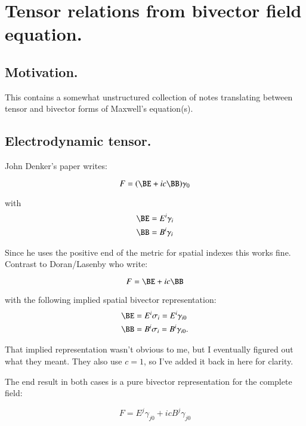 \chapter{Tensor relations from bivector field equation.}\label{chap:PJMaxwellTensor}

\section{Motivation. }

This contains a somewhat unstructured collection of notes translating between tensor and bivector forms of Maxwell's equation(s).

\section{Electrodynamic tensor. }

John Denker's paper \cite{DenkerMaxwell} writes:

\begin{equation}
F = (\BE + ic\BB) \gamma_0
\end{equation}

with
\begin{align*}
\BE &= E^i \gamma_i \\
\BB &= B^i \gamma_i
\end{align*}

Since he uses the positive end of the metric for spatial indexes this works fine.  Contrast to Doran/Lasenby who write:

\begin{equation}
F = \BE + ic\BB
\end{equation}

with the following implied spatial bivector representation:
\begin{align*}
\BE &= E^i \sigma_i = E^i \gamma_{i0} \\
\BB &= B^i \sigma_i = B^i \gamma_{i0}.
\end{align*}

That implied representation wasn't obvious to me, but I eventually figured out what they meant.  They also use $c=1$, so I've added it back in here for clarity.

The end result in both cases is a pure bivector representation for the complete field:

\begin{equation*}
F = E^j \gamma_{j0} + ic B^j \gamma_{j0}
\end{equation*}


